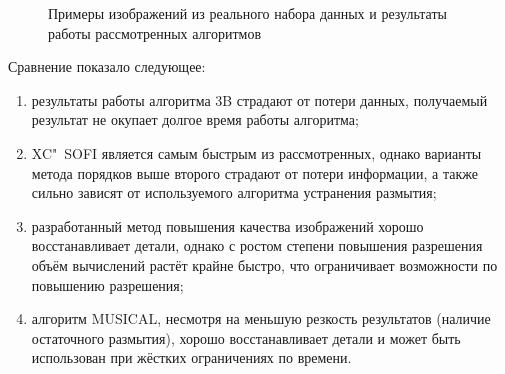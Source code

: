 \begin{figure}[ht]
	\caption{Примеры изображений из реального набора данных и результаты работы рассмотренных алгоритмов}
	\label{fig:blinking-results-real}
\end{figure}

Сравнение показало следующее:
\begin{enumerate}[beginpenalty=10000]
	\item результаты работы алгоритма 3B страдают от потери данных, получаемый результат не окупает долгое время работы алгоритма;
	\item XC"~SOFI является самым быстрым из рассмотренных, однако варианты метода порядков выше второго страдают от потери информации, а также сильно зависят от используемого алгоритма устранения размытия;
	\item разработанный метод повышения качества изображений хорошо восстанавливает детали, однако с ростом степени повышения разрешения объём вычислений растёт крайне быстро, что ограничивает возможности по повышению разрешения;
	\item алгоритм MUSICAL, несмотря на меньшую резкость результатов (наличие остаточного размытия), хорошо восстанавливает детали и может быть использован при жёстких ограничениях по времени.
\end{enumerate}

